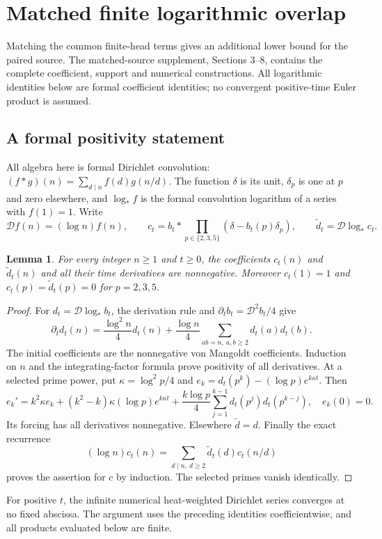 \documentclass[11pt,a4paper]{article}
\newtheorem{lemma}[theorem]{Lemma}
\theoremstyle{definition}\newtheorem{definition}[theorem]{Definition}
\theoremstyle{remark}\newtheorem{remark}[theorem]{Remark}
\begin{document}
\section{Matched finite logarithmic overlap}\label{sec:matched}
Matching the common finite-head terms gives an additional lower bound
for the paired source. The matched-source supplement, Sections 3--8,
contains the complete coefficient, support and numerical constructions. All logarithmic
identities below are formal coefficient identities; no convergent
positive-time Euler product is assumed.

\subsection{A formal positivity statement}
All algebra here is formal Dirichlet convolution:
$(f*g)(n)=\sum_{d\mid n}f(d)g(n/d)$. The function $\delta$ is its unit,
$\delta_p$ is one at $p$ and zero elsewhere, and $\log_*f$ is the formal
convolution logarithm of a series with $f(1)=1$. Write
\[
\mathcal Df(n)=(\log n)f(n),\qquad
c_t=b_t*\prod_{p\in\{2,3,5\}}(\delta-b_t(p)\delta_p),
\qquad \widetilde d_t=\mathcal D\log_*c_t.
\]
\begin{lemma}\label{lem:positive}
For every integer $n\ge1$ and $t\ge0$, the coefficients $c_t(n)$ and
$\widetilde d_t(n)$ and all their time derivatives are nonnegative.
Moreover $c_t(1)=1$ and $c_t(p)=\widetilde d_t(p)=0$ for $p=2,3,5$.
\end{lemma}
\begin{proof}
For $d_t=\mathcal D\log_*b_t$, the derivation rule and
$\partial_t b_t=\mathcal D^2b_t/4$ give
\[
\partial_t d_t(n)=\frac{\log^2n}{4}d_t(n)
+\frac{\log n}{4}\sum_{ab=n,\ a,b\ge2}d_t(a)d_t(b).
\]
The initial coefficients are the nonnegative von Mangoldt coefficients.
Induction on $n$ and the integrating-factor formula prove positivity of
all derivatives. At a selected prime power, put $\kappa=\log^2p/4$ and
$e_k=d_t(p^k)-(\log p)e^{k\kappa t}$. Then
\[
e_k'=k^2\kappa e_k+(k^2-k)\kappa(\log p)e^{k\kappa t}
+\frac{k\log p}{4}\sum_{j=1}^{k-1}d_t(p^j)d_t(p^{k-j}),\quad e_k(0)=0.
\]
Its forcing has all derivatives nonnegative. Elsewhere $\widetilde d=d$.
Finally the exact recurrence
\begin{equation}\label{eq:conv}
(\log n)c_t(n)=\sum_{d\mid n,\ d\ge2}\widetilde d_t(d)c_t(n/d)
\end{equation}
proves the assertion for $c$ by induction. The selected primes vanish
identically.
\end{proof}
For positive $t$, the infinite numerical heat-weighted Dirichlet series
converges at no fixed abscissa. The argument uses the preceding identities coefficientwise, and all
products evaluated below are finite.
\end{document}
